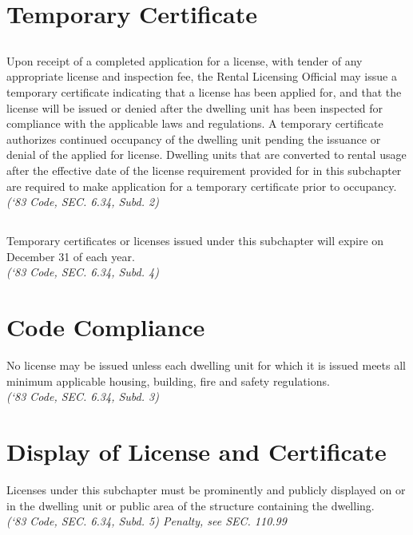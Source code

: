 \section{Temporary Certificate}
\subsection{}
Upon receipt of a completed application for a license, with tender of any appropriate license and inspection fee, the Rental Licensing Official may issue a temporary certificate indicating that a license has been applied for, and that the license will be issued or denied after the dwelling unit has been inspected for compliance with the applicable laws and regulations.  A temporary certificate authorizes continued occupancy of the dwelling unit pending the issuance or denial of the applied for license.  Dwelling units that are converted to rental usage after the effective date of the license requirement provided for in this subchapter are required to make application for a temporary certificate prior to occupancy.\\
\emph{(‘83 Code, SEC. 6.34, Subd. 2)}
\subsection{}
Temporary certificates or licenses issued under this subchapter will expire on December 31 of each year.\\
\emph{(‘83 Code, SEC. 6.34, Subd. 4)}
\section{Code Compliance}
No license may be issued unless each dwelling unit for which it is issued meets all minimum applicable housing, building, fire and safety regulations.\\
\emph{(‘83 Code, SEC. 6.34, Subd. 3)}
\section{Display of License and Certificate}
Licenses under this subchapter must be prominently and publicly displayed on or in the dwelling unit or public area of the structure containing the dwelling.\\
\emph{(‘83 Code, SEC. 6.34, Subd. 5)  Penalty, see SEC. 110.99}
